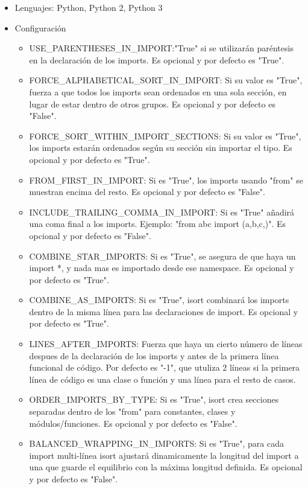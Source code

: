 \documentclass[a4paper, 12pt]{book}
\begin{document}
\begin{itemize}
  \item Lenguajes: Python, Python 2, Python 3
  \item Configuración
    \begin{itemize}
          \item USE\_PARENTHESES\_IN\_IMPORT:"True" si se utilizarán paréntesis en la declaración de los imports. Es opcional y por defecto es "True".
          \item FORCE\_ALPHABETICAL\_SORT\_IN\_IMPORT: Si su valor es "True", fuerza a que todos los imports sean ordenados en una sola sección, en lugar de estar dentro de otros grupos. Es opcional y por defecto es "False".
          \item FORCE\_SORT\_WITHIN\_IMPORT\_SECTIONS: Si su valor es "True", los imports estarán ordenados según su sección sin importar el tipo. Es opcional y por defecto es "True".
          \item FROM\_FIRST\_IN\_IMPORT: Si es "True", los imports usando "from" se muestran encima del resto. Es opcional y por defecto es "False".
          \item INCLUDE\_TRAILING\_COMMA\_IN\_IMPORT: Si es "True" añadirá una coma final a los imports. Ejemplo: "from abc import (a,b,c,)". Es opcional y por defecto es "False".
          \item COMBINE\_STAR\_IMPORTS: Si es "True", se asegura de que haya un import *, y nada mas es importado desde ese namespace. Es opcional y por defecto es "True".
          \item COMBINE\_AS\_IMPORTS: Si es "True", isort combinará los imports dentro de la misma línea para las declaraciones de import. Es opcional y por defecto  es "True".
          \item LINES\_AFTER\_IMPORTS: Fuerza que haya un cierto número de líneas despues de la declaración de los imports y antes de la primera línea funcional de código. Por defecto es "-1", que utuliza 2 líneas si la primera línea de código es una clase o función y una línea para el resto de casos.
          \item ORDER\_IMPORTS\_BY\_TYPE: Si es "True", isort crea secciones separadas dentro de los "from" para constantes, clases y módulos/funciones. Es opcional y por defecto es "False".
          \item BALANCED\_WRAPPING\_IN\_IMPORTS: Si es "True", para cada import multi-línea isort ajustará dinamicamente la longitud del import a una que guarde el equilibrio con la máxima longitud definida. Es opcional y por defecto es "False".

\end{itemize}
\end{itemize}
\end{document}
